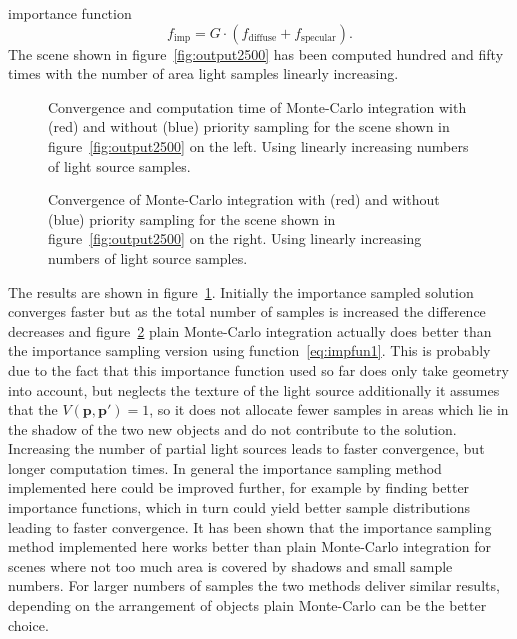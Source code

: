 importance function 
\begin{equation}
f_{\text{imp}} = G \cdot ( f_{\text{diffuse}} + f_{\text{specular}} ).
\label{eq:impfun1}
\end{equation}
The scene shown in figure~\ref{fig:output2500} has been computed hundred and fifty times with the number of area light samples linearly increasing.
\begin{figure}
\centering


\caption{Convergence and computation time of Monte-Carlo integration with (red) and without (blue) priority sampling for the scene shown in figure~\ref{fig:output2500} on the left. Using linearly increasing numbers of light source samples. }
\label{fig:impSampExp1}
\end{figure}
\begin{figure}
\centering

\caption{Convergence of Monte-Carlo integration with (red) and without (blue) priority sampling for the scene shown in figure~\ref{fig:output2500} on the right. Using linearly increasing numbers of light source samples. }
\label{fig:impSampExp2}
\end{figure}
The results are shown in figure~\ref{fig:impSampExp1}. Initially the importance sampled solution converges faster but as the total number of samples is increased the difference decreases and figure~\ref{fig:impSampExp2} plain Monte-Carlo integration actually does better than the importance sampling version using function~\ref{eq:impfun1}. This is probably due to the fact that this importance function used so far does only take geometry into account, but neglects the texture of the light source additionally it assumes that the $V(\mathbf{p},\mathbf{p}') = 1$, so it does not allocate fewer samples in areas which lie in the shadow of the two new objects and do not contribute to the solution. Increasing the number of partial light sources leads to faster convergence, but longer computation times. 
In general the importance sampling method implemented here could be improved further, for example by finding better importance functions, which in turn could yield better sample distributions leading to faster convergence. It has been shown that the importance sampling method implemented here
works better than plain Monte-Carlo integration for scenes where not too much area is covered by shadows and small sample numbers. For larger numbers of samples the two methods deliver similar results, depending on the arrangement of objects plain Monte-Carlo can be the better choice.  
